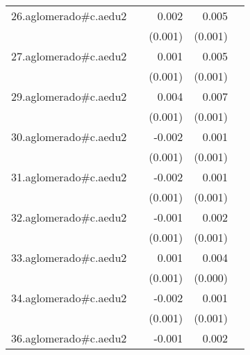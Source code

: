 {\begin{longtable}{l*{4}{D{.}{.}{-1}}}
\addlinespace
26.aglomerado#c.aedu2&                     &       0.002         &       0.005\sym{***}&                     \\
            &                     &     (0.001)         &     (0.001)         &                     \\
\addlinespace
27.aglomerado#c.aedu2&                     &       0.001         &       0.005\sym{***}&                     \\
            &                     &     (0.001)         &     (0.001)         &                     \\
\addlinespace
29.aglomerado#c.aedu2&                     &       0.004\sym{**} &       0.007\sym{***}&                     \\
            &                     &     (0.001)         &     (0.001)         &                     \\
\addlinespace
30.aglomerado#c.aedu2&                     &      -0.002         &       0.001         &                     \\
            &                     &     (0.001)         &     (0.001)         &                     \\
\addlinespace
31.aglomerado#c.aedu2&                     &      -0.002         &       0.001         &                     \\
            &                     &     (0.001)         &     (0.001)         &                     \\
\addlinespace
32.aglomerado#c.aedu2&                     &      -0.001         &       0.002\sym{*}  &                     \\
            &                     &     (0.001)         &     (0.001)         &                     \\
\addlinespace
33.aglomerado#c.aedu2&                     &       0.001         &       0.004\sym{***}&                     \\
            &                     &     (0.001)         &     (0.000)         &                     \\
\addlinespace
34.aglomerado#c.aedu2&                     &      -0.002         &       0.001         &                     \\
            &                     &     (0.001)         &     (0.001)         &                     \\
\addlinespace
36.aglomerado#c.aedu2&                     &      -0.001         &       0.002\sym{*}  &                     \\

\end{longtable}}
